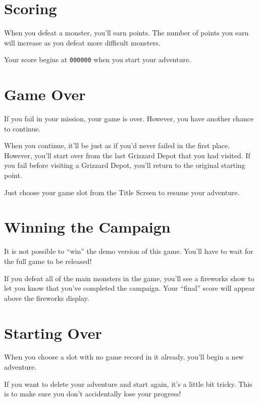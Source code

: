 \documentclass[12pt,openright,book]{memoir}
\begin{document}
\begin{description}
\section{Scoring}

When you  defeat a monster, you'll  earn points. The number  of points
you earn will increase as you defeat more difficult monsters.

Your score begins at \texttt{000000} when you start your adventure.

\section{Game Over}

If  you fail  in your  mission,  your game  is over.  However, you  have
another chance to continue.

When you continue, it'll  be just as if you'd never  failed in the first
place. However, you'll start over from  the last Grizzard Depot that you
had visited. If you fail before visiting a Grizzard Depot, you'll return
to the original starting point.

Just  choose   your  game   slot  from  the   Title  Screen   to  resume
your adventure.

\section{Winning the Campaign}\label{Winning the Campaign}

\ifdefined\DEMO

It is not possible to ``win'' the demo version of this game. You'll have
to wait for the full game to be released!

\else

If  you  defeat  all of  the  main  monsters  in  the game,  you'll  see
a fireworks  show to let  you know  that you've completed  the campaign.
Your ``final'' score will appear above the fireworks display.

\fi

\section{Starting Over}\label{Starting Your Adventure Over}

When you choose a  slot with no game record in  it already, you'll begin
a new adventure.

If you want to delete your adventure  and start again, it's a little bit
tricky. This is to make sure you don't accidentally lose your progress!


\end{description}
\end{document}

